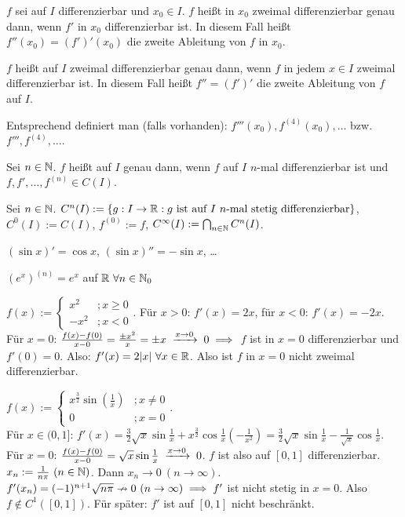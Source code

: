 \documentclass[a4paper,twoside,DIV15,BCOR12mm]{scrbook}
\begin{document}
\begin{definition}
\begin{liste}
\item $f$ sei auf $I$ differenzierbar und $x_0 \in I$. $f$ heißt in $x_0$ zweimal differenzierbar genau dann, wenn $f'$ in $x_0$ differenzierbar ist. In diesem Fall heißt $f''(x_0) = (f')'(x_0)$ die zweite Ableitung von $f$ in $x_0$.
\item $f$ heißt auf $I$ zweimal differenzierbar genau dann, wenn $f$ in jedem $x\in I$ zweimal differenzierbar ist. In diesem Fall heißt $f''=(f')'$ die zweite Ableitung von $f$ auf $I$.
\item Entsprechend definiert man (falls vorhanden): $f'''(x_0), f^{(4)}(x_0),\ldots$ bzw. $f''', f^{(4)}, \ldots$.
\item Sei $n\in\mathbb{N}$. $f$ heißt auf $I$  genau dann, wenn $f$ auf $I$ $n$-mal differenzierbar ist und $f,f',\ldots,f^{(n)}\in C(I)$.
\item Sei $n\in\mathbb{N}$. $C^n(I) := \{ g:  I\to \MdR: g\text{ ist auf }I\ n\text{-mal stetig differenzierbar}\}$, $C^0(I) := C(I)$, $f^{(0)} := f$, $C^\infty(I) := \bigcap_{n\in\mathbb{N}}C^n(I)$.
\end{liste}
\end{definition}

\begin{beispiele}
\item $(\sin x)' = \cos x$, $(\sin x)'' = -\sin x$, \ldots
\item $(e^x)^{(n)} = e^x$ auf $\mathbb{R} \ \forall n\in\mathbb{N}_0$
\item $f(x) := \begin{cases}x^2 &; x\ge0 \\ -x^2 &; x<0\end{cases}$. Für $x>0$: $f'(x) = 2x$, für $x<0$: $f'(x) = -2x$. \\
Für $x=0$: $\frac{f(x)-f(0)}{x-0} = \frac{\pm x^2}{x} = \pm x \tomit{x\to 0} 0 \folgt$ $f$ ist in $x=0$ differenzierbar und $f'(0)=0$. Also: $f'(x)= 2|x|\ \forall x\in\mathbb{R}$. Also ist $f$ in $x=0$ nicht zweimal differenzierbar.
\item $f(x) := \begin{cases}x^{\frac{3}{2}}\sin(\frac{1}{x}) &; x\ne0 \\ 0 &; x=0\end{cases}$.  \\
Für $x\in(0,1]$: $f'(x) = \frac{3}{2}\sqrt{x}\sin\frac{1}{x} + x^{\frac{3}{2}}\cos\frac{1}{x}(-\frac{1}{x^2}) = \frac{3}{2}\sqrt{x}\sin\frac{1}{x} - \frac{1}{\sqrt{x}} \cos \frac{1}{x}$. \\
Für $x=0$: $\frac{f(x)-f(0)}{x-0} = \sqrt{x}\sin\frac{1}{x} \tomit{x\to 0} 0$. $f$ ist also auf $[0,1]$ differenzierbar.\\
$x_n := \frac{1}{n\pi}\ (n\in\mathbb{N})$. Dann $x_n \to 0 \ (n\to\infty)$. $f'(x_n) = (-1)^{n+1}\sqrt{n\pi} \nrightarrow 0 \ (n\to \infty) \implies f'$ ist nicht stetig in $x=0$. Also $f\notin C^1([0,1])$. Für später: $f'$ ist auf $[0,1]$ nicht beschränkt.
\end{beispiele}
\end{document}
